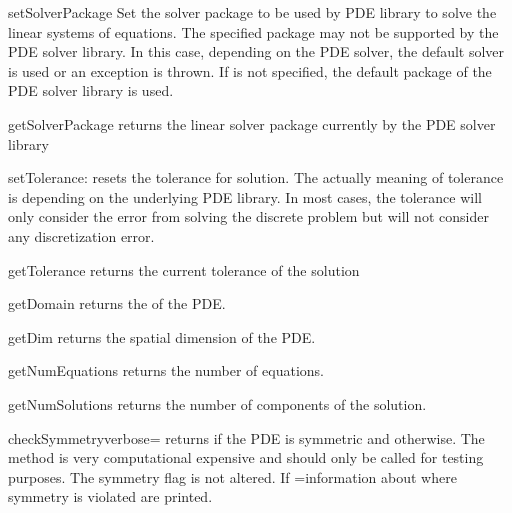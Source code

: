 \begin{methoddesc}[LinearPDE]{setSolverPackage}{}
Set the solver package to be used by PDE library to solve the linear systems of equations. The
specified package may not be supported by the PDE solver library. In this case, depending on
the PDE solver, the default solver is used or an exception is thrown.
If  is not specified, the default package of the PDE solver library is used.
\end{methoddesc}

\begin{methoddesc}[LinearPDE]{getSolverPackage}{}
returns the linear solver package currently by the PDE solver library
\end{methoddesc}


\begin{methoddesc}[LinearPDE]{setTolerance}{}:
resets the tolerance for solution. The actually meaning of tolerance is
depending on the underlying PDE library. In most cases, the tolerance
will only consider the error from solving the discrete problem but will
not consider any discretization error.
\end{methoddesc}

\begin{methoddesc}[LinearPDE]{getTolerance}{}
returns the current tolerance of the solution
\end{methoddesc}

\begin{methoddesc}[LinearPDE]{getDomain}{}
returns the \Domain of the PDE.
\end{methoddesc}

\begin{methoddesc}[LinearPDE]{getDim}{}
returns the spatial dimension of the PDE.
\end{methoddesc}

\begin{methoddesc}[LinearPDE]{getNumEquations}{}
returns the number of equations.
\end{methoddesc}

\begin{methoddesc}[LinearPDE]{getNumSolutions}{}
returns the number of components of the solution.
\end{methoddesc}

\begin{methoddesc}[LinearPDE]{checkSymmetry}{verbose=\False}
returns \True if the PDE is symmetric and \False otherwise.
The method is very computational expensive and should only be
called for testing purposes. The symmetry flag is not altered.
If =\True information about where symmetry is violated
are printed.
\end{methoddesc}

